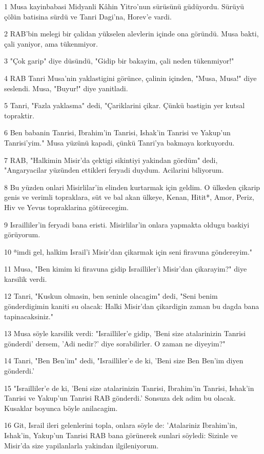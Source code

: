 \par 1 Musa kayinbabasi Midyanli Kâhin Yitro'nun sürüsünü güdüyordu. Sürüyü çölün batisina sürdü ve Tanri Dagi'na, Horev'e vardi.
\par 2 RAB'bin melegi bir çalidan yükselen alevlerin içinde ona göründü. Musa bakti, çali yaniyor, ama tükenmiyor.
\par 3 "Çok garip" diye düsündü, "Gidip bir bakayim, çali neden tükenmiyor!"
\par 4 RAB Tanri Musa'nin yaklastigini görünce, çalinin içinden, "Musa, Musa!" diye seslendi. Musa, "Buyur!" diye yanitladi.
\par 5 Tanri, "Fazla yaklasma" dedi, "Çariklarini çikar. Çünkü bastigin yer kutsal topraktir.
\par 6 Ben babanin Tanrisi, Ibrahim'in Tanrisi, Ishak'in Tanrisi ve Yakup'un Tanrisi'yim." Musa yüzünü kapadi, çünkü Tanri'ya bakmaya korkuyordu.
\par 7 RAB, "Halkimin Misir'da çektigi sikintiyi yakindan gördüm" dedi, "Angaryacilar yüzünden ettikleri feryadi duydum. Acilarini biliyorum.
\par 8 Bu yüzden onlari Misirlilar'in elinden kurtarmak için geldim. O ülkeden çikarip genis ve verimli topraklara, süt ve bal akan ülkeye, Kenan, Hitit*, Amor, Periz, Hiv ve Yevus topraklarina götürecegim.
\par 9 Israilliler'in feryadi bana eristi. Misirlilar'in onlara yapmakta oldugu baskiyi görüyorum.
\par 10 ªimdi gel, halkim Israil'i Misir'dan çikarmak için seni firavuna göndereyim."
\par 11 Musa, "Ben kimim ki firavuna gidip Israilliler'i Misir'dan çikarayim?" diye karsilik verdi.
\par 12 Tanri, "Kuskun olmasin, ben seninle olacagim" dedi, "Seni benim gönderdigimin kaniti su olacak: Halki Misir'dan çikardigin zaman bu dagda bana tapinacaksiniz."
\par 13 Musa söyle karsilik verdi: "Israilliler'e gidip, 'Beni size atalarinizin Tanrisi gönderdi' dersem, 'Adi nedir?' diye sorabilirler. O zaman ne diyeyim?"
\par 14 Tanri, "Ben Ben'im" dedi, "Israilliler'e de ki, 'Beni size Ben Ben'im diyen gönderdi.'
\par 15 "Israilliler'e de ki, 'Beni size atalarinizin Tanrisi, Ibrahim'in Tanrisi, Ishak'in Tanrisi ve Yakup'un Tanrisi RAB gönderdi.' Sonsuza dek adim bu olacak. Kusaklar boyunca böyle anilacagim.
\par 16 Git, Israil ileri gelenlerini topla, onlara söyle de: 'Atalariniz Ibrahim'in, Ishak'in, Yakup'un Tanrisi RAB bana görünerek sunlari söyledi: Sizinle ve Misir'da size yapilanlarla yakindan ilgileniyorum.
